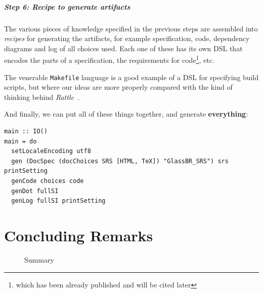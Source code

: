\documentclass[a4paper,UKenglish,cleveref,autoref,thm-restate]{oasics-v2021}
\begin{document}
\subparagraph*{Step 6: Recipe to generate artifacts}

The various pieces of knowledge specified in the previous steps are assembled
into \emph{recipes} for generating the artifacts, for example specification,
code, dependency diagrams and log of all choices used.  Each one of these has
its own DSL that encodes the parts of a specification, the requirements for
code\footnote{which has been already published and will be cited later}, etc.

The venerable \texttt{Makefile} language is a good example of a DSL for
specifying build scripts, but where our ideas are more properly compared with
the kind of thinking behind \textit{Rattle}~\cite{mitchell:rattle_18_nov_2020}.

And finally, we can put all of these things together, and generate
\textbf{everything}:
\begin{lstlisting}
main :: IO()
main = do
  setLocaleEncoding utf8
  gen (DocSpec (docChoices SRS [HTML, TeX]) "GlassBR_SRS") srs printSetting
  genCode choices code
  genDot fullSI
  genLog fullSI printSetting
\end{lstlisting}

\section{Concluding Remarks}
\label{sec:concluding-remarks}



\begin{figure}
  \centering
  \caption{Summary}
  \label{fig:summary}
\end{figure}
\end{document}
